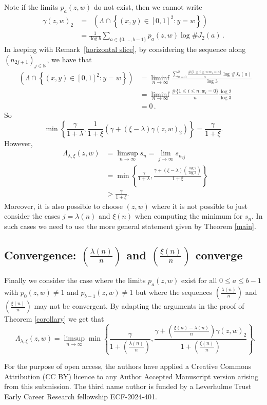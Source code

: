\documentclass[12pt]{article}
\theoremstyle{remark}
\numberwithin{equation}{section}
\renewcommand{\Bbb}[1]{\mathbb{#1}}
\newcommand{\N}{{\Bbb N}}         %
\newcommand{\0}{\mathbf{0}}
\DeclareMathOperator{\dimh}{\dim_H}
\begin{document}
Note if the limits $p_{a}(z,w)$ do not exist, then we cannot write \begin{align*}
    \gamma(z,w)_{2} &=\dimh \left(\Lambda \cap \left\{(x,y) \in [0,1]^{2} : y=w\right\}\right) \\
                    &=\frac{1}{\log b} \sum_{a \in \{0, \dots , b-1\}} p_{a}(z,w) \log \#J_{2}(a)\,.
\end{align*} 
In keeping with Remark~\ref{horizontal slice}, by considering the sequence along $(n_{2j+1})_{j\in \N}$, we have that
\begin{align*}
    \dimh \left(\Lambda \cap \left\{(x,y) \in [0,1]^{2} : y=w\right\}\right)& = \liminf_{n\to \infty}\frac{\sum_{a=0}^{2}\frac{\#\{1\leq i\leq n: w_{i}=a\}}{n}\log\#J_2(a)}{\log 3} \\
    &=\liminf_{n\to \infty} \frac{\#\{1\leq i\leq n: w_{i}=0\}}{n}\frac{\log 2}{\log 3}\\
    &=0\, .
\end{align*}
 So
$$\min\left\{\frac{\gamma}{1+\lambda},\frac{1}{1+\xi}\left(\gamma+(\xi-\lambda)\gamma(z,w)_{2} \right)\right\}=\frac{\gamma}{1+\xi}.$$
However,
\begin{align*}
\dimh \Lambda_{\lambda,\xi}(z,w) &=\limsup_{n\to\infty}s_n =\lim_{j\to\infty} s_{n_{2j}} \\
&=\min\left\{\frac{\gamma}{1+\lambda},\frac{\gamma+(\xi-\lambda)\left(\frac{\log 2}{\log 3}\right)}{1+\xi}\right\} \\
&>\frac{\gamma}{1+\xi}.
\end{align*}
Moreover, it is also possible to choose $(z,w)$ where it is not possible to just consider the cases $j=\lambda(n)$ and $\xi(n)$ when computing the minimum for $s_n$. In such cases we need to use the more general statement given by Theorem \ref{main}.

\subsection{Convergence: $\left(\frac{\lambda(n)}{n}\right)$ and $\left(\frac{\xi(n)}{n}\right)$ converge}

Finally we consider the case where the limits $p_a(z,w)$ exist for all $0\leq a \leq b-1$ with \mbox{$p_0(z,w) \neq 1$} and $p_{b-1}(z,w)\neq 1$ but where the sequences $\left(\frac{\lambda(n)}{n}\right)$ and $\left(\frac{\xi(n)}{n}\right)$ may not be convergent. By adapting the arguments in the proof of Theorem \ref{corollary} we get that
$$\dimh \Lambda_{\lambda,\xi}(z,w)=\limsup_{n\to\infty}\min\left\{\frac{\gamma}{1+\left(\tfrac{\lambda(n)}{n}\right)},\frac{\gamma+\left(\tfrac{\xi(n)-\lambda(n)}{n}\right)\gamma(z,w)_2}{1+\left(\tfrac{\xi(n)}{n}\right)}\right\}.$$

 For the purpose of open access, the authors have applied a Creative Commons Attribution (CC BY) licence to any Author Accepted Manuscript version arising from this submission. The third name author is funded by a Leverhulme Trust Early Career Research fellowship ECF-2024-401.



 
 
\end{document}
